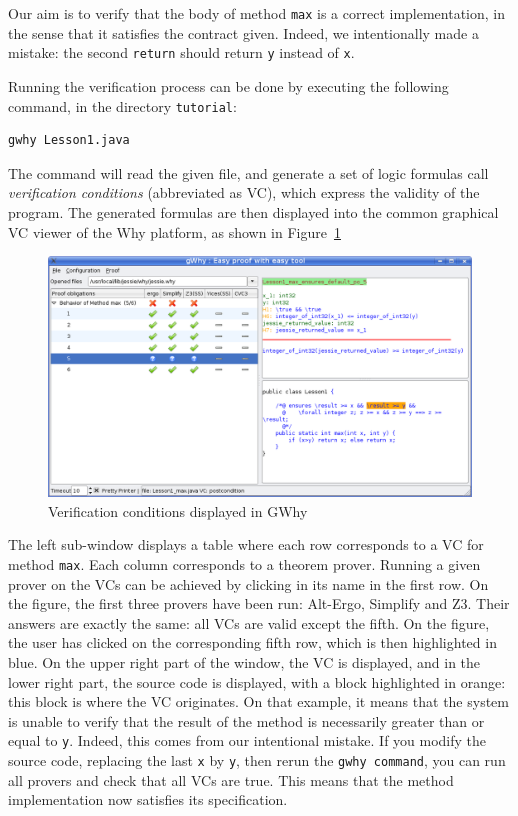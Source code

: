 \documentclass[a4paper,11pt,twoside,openright]{report}
\begin{document}
Our aim is to verify that the body of method \texttt{max} is a correct
implementation, in the sense that it satisfies the contract
given. Indeed, we intentionally made a mistake: the second
\texttt{return} should return \texttt{y} instead of \texttt{x}.

Running the verification process can be done by executing the
following command, in the directory \verb|tutorial|: 
\begin{verbatim}
gwhy Lesson1.java
\end{verbatim}
The command will read the given file, and generate a set of logic
formulas call \emph{verification conditions} (abbreviated as VC),
which express the validity of the program. The generated formulas are
then displayed into the common graphical VC viewer of the Why
platform, as shown in Figure~\ref{fig:gwhy}

\begin{figure}[t]
  \begin{center}
    \includegraphics[width=\textwidth]{Lesson1_max.png}
  \end{center}
  \caption{Verification conditions displayed in GWhy}
\label{fig:gwhy}
\hrulefill
\end{figure}

The left sub-window displays a table where each row corresponds to a
VC for method \texttt{max}. Each column corresponds to a theorem
prover. Running a given prover on the VCs can be achieved by clicking
in its name in the first row. On the figure, the first three provers
have been run: Alt-Ergo, Simplify and Z3. Their answers are exactly the
same: all VCs are valid except the fifth. On the figure, the user has
clicked on the corresponding fifth row, which is then highlighted in
blue. On the upper right part of the window, the VC is displayed, and
in the lower right part, the source code is displayed, with a block
highlighted in orange: this block is where the VC originates. On that
example, it means that the system is unable to verify that the result
of the method is necessarily greater than or equal to
\texttt{y}. Indeed, this comes from our intentional mistake. If you
modify the source code, replacing the last \texttt{x} by \texttt{y},
then rerun the \texttt{gwhy command}, you can run all provers and
check that all VCs are true. This means that the method implementation
now satisfies its specification.
\end{document}
